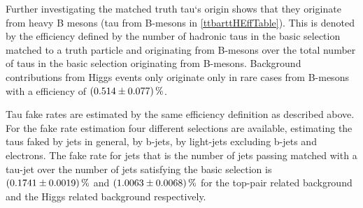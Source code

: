 %
Further investigating the matched truth tau`s origin shows that they originate from heavy B mesons (tau from B-mesons in \ref{ttbarttHEffTable}). This is denoted by the efficiency defined by the number of hadronic taus in the basic selection matched to a truth particle and originating from B-mesons over the total number of taus in the basic selection originating from B-mesons. Background contributions from Higgs events only originate only in rare cases from B-mesons with a efficiency of $\SI{0.514\pm 0.077}{\percent}$.\par       
%   
%
Tau fake rates are estimated by the same efficiency definition as described above.%
For the fake rate estimation four different selections are available, estimating the taus faked by jets in general, by b-jets, by light-jets excluding b-jets and electrons. The fake rate for jets that is the number of jets passing matched with a tau-jet over the number of jets satisfying the basic selection is $\SI{0.1741\pm 0.0019}{\percent}$ and $\SI{1.0063\pm 0.0068}{\percent}$ for the top-pair related background and the Higgs related background respectively.\newline
